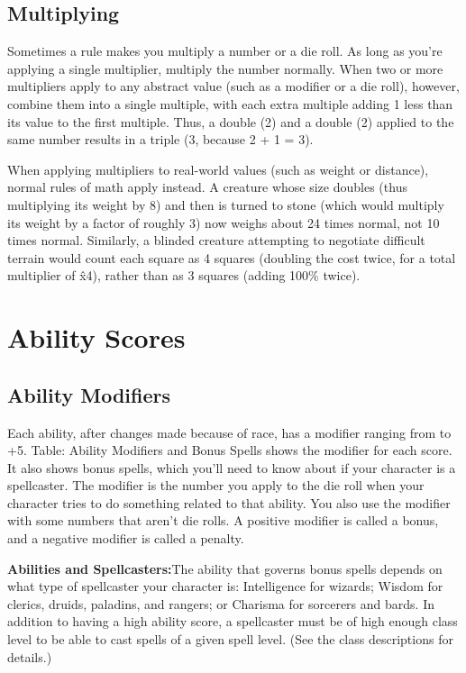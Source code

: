\subsection{Multiplying}
Sometimes a rule makes you multiply a number or a die roll. As long as you're applying a single multiplier, multiply the number normally. When two or more multipliers apply to any abstract value (such as a modifier or a die roll), however, combine them into a single multiple, with each extra multiple adding 1 less than its value to the first multiple. Thus, a double (2) and a double (2) applied to the same number results in a triple (3, because 2 + 1 = 3).

When applying multipliers to real-world values (such as weight or distance), normal rules of math apply instead. A creature whose size doubles (thus multiplying its weight by 8) and then is turned to stone (which would multiply its weight by a factor of roughly 3) now weighs about 24 times normal, not 10 times normal. Similarly, a blinded creature attempting to negotiate difficult terrain would count each square as 4 squares (doubling the cost twice, for a total multiplier of \^{x}4), rather than as 3 squares (adding 100\% twice). 

\section{Ability Scores}

\subsection{Ability Modifiers}

Each ability, after changes made because of race, has a modifier ranging from  to +5. Table: Ability Modifiers and Bonus Spells shows the modifier for each score. It also shows bonus spells, which you'll need to know about if your character is a spellcaster.
The modifier is the number you apply to the die roll when your character tries to do something related to
that ability. You also use the modifier with some numbers that aren't die rolls. A positive modifier is called a bonus, and a negative modifier is called a penalty.

\textbf{Abilities and Spellcasters:}{The ability that governs bonus spells depends on what type of spellcaster your character is: Intelligence for wizards; Wisdom for clerics, druids, paladins, and rangers; or Charisma for sorcerers and bards. In addition to having a high ability score, a spellcaster must be of high enough class level to be able to cast spells of a given spell level. (See the class descriptions for details.)}

